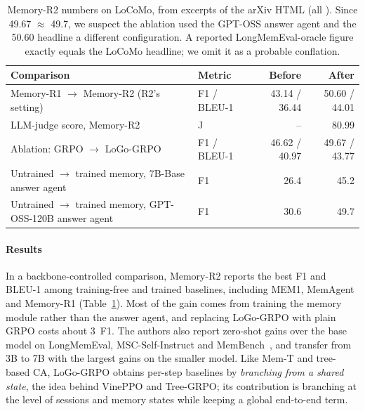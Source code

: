 \begin{table}[t]
\centering\small
\caption{Memory-R2 numbers on LoCoMo, from excerpts of the arXiv HTML (all \unverified). Since 49.67 $\approx$ 49.7, we suspect the ablation used the GPT-OSS answer agent and the 50.60 headline a different configuration. A reported LongMemEval-oracle figure exactly equals the LoCoMo headline; we omit it as a probable conflation.}
\label{tab:memr2}
\begin{tabularx}{\textwidth}{@{}X l r r@{}}
\toprule
Comparison & Metric & Before & After \\
\midrule
Memory-R1 $\to$ Memory-R2 (R2's setting) & F1 / BLEU-1 & 43.14 / 36.44 & 50.60 / 44.01 \\
\quad LLM-judge score, Memory-R2 & J & -- & 80.99 \\
Ablation: GRPO $\to$ LoGo-GRPO & F1 / BLEU-1 & 46.62 / 40.97 & 49.67 / 43.77 \\
Untrained $\to$ trained memory, 7B-Base answer agent & F1 & 26.4 & 45.2 \\
Untrained $\to$ trained memory, GPT-OSS-120B answer agent & F1 & 30.6 & 49.7 \\
\bottomrule
\end{tabularx}
\end{table}

\paragraph{Results}
In a backbone-controlled comparison, Memory-R2 reports the best F1 and BLEU-1 among training-free and trained baselines, including MEM1, MemAgent and Memory-R1 (Table~\ref{tab:memr2}). Most of the gain comes from training the memory module rather than the answer agent, and replacing LoGo-GRPO with plain GRPO costs about 3~F1. The authors also report zero-shot gains over the base model on LongMemEval, MSC-Self-Instruct and MemBench~\citep{tan2025membench}, and transfer from 3B to 7B with the largest gains on the smaller model\unverified. Like Mem-T and tree-based CA, LoGo-GRPO obtains per-step baselines by \emph{branching from a shared state}, the idea behind VinePPO and Tree-GRPO; its contribution is branching at the level of sessions and memory states while keeping a global end-to-end term.

